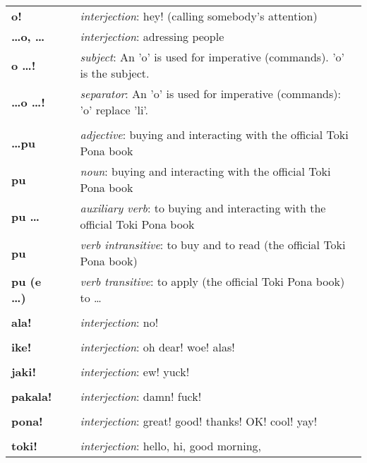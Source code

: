 \begin{supertabular}{p{2,5cm}|ll}
%
\textbf{o!} && \textit{interjection}: hey! (calling somebody's attention) \\ %
\textbf{\dots o, \dots} && \textit{interjection}: adressing people \\ %
\textbf{o \dots !} && \textit{subject}: An 'o' is used for imperative (commands). 'o' is the subject.  \\ %
\textbf{\dots o \dots !} && \textit{separator}: An 'o' is used for imperative (commands): 'o' replace 'li'. \\ %
 && \\ %
%
\textbf{\dots pu} && \textit{adjective}: buying and interacting with the official Toki Pona book \\ 
\textbf{pu} && \textit{noun}: buying and interacting with the official Toki Pona book \\ 
\textbf{pu \dots} && \textit{auxiliary verb}: to buying and interacting with the official Toki Pona book \\ 
\textbf{pu} && \textit{verb intransitive}:  to buy and to read (the official Toki Pona book) \\
\textbf{pu (e \dots)} && \textit{verb transitive}: to apply (the official Toki Pona book) to \dots \\
 && \\ %
%
\textbf{ala!} && \textit{interjection}: no! \\ %
 && \\ %
%
\textbf{ike!} && \textit{interjection}: oh dear! woe! alas! \\ %
 && \\ %
%
\textbf{jaki!} && \textit{interjection}: ew! yuck! \\ %
 && \\ %
%
\textbf{pakala!} && \textit{interjection}: damn! fuck! \\ %
 && \\ %
%
\textbf{pona!} && \textit{interjection}: great! good! thanks! OK! cool! yay! \\ %
 && \\ %
%
\textbf{toki!} && \textit{interjection}: hello, hi, good morning, \\ %
\end{supertabular} \\
%
%


